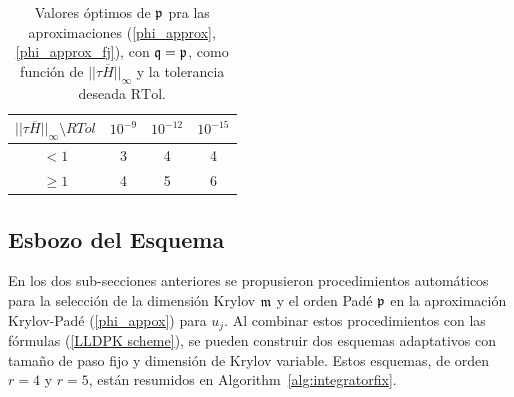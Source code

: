 \begin{table}[htb]
	\caption{Valores óptimos de $\mathfrak{p}$ pra las aproximaciones  (\ref{phi_approx},\ref{phi_approx_fj}), con $\mathfrak{q}=\mathfrak{p}$, como función de $\lvert\lvert \tau\overline{H} \rvert\rvert_\infty$ y la tolerancia deseada $\mathrm{RTol}$.}
	\begin{center}
		\begin{tabular}{cccc}
			\hline
			$\lvert\lvert \tau\overline{H} \rvert\rvert_\infty \setminus RTol$ & $10^{-9}$ & $10^{-12}$ & $10^{-15}$ \\
			\hline
			$<1$ & 3 & 4 & 4 \\
			$\geq 1$ & 4 & 5 & 6 \\
			\hline
		\end{tabular}
		\label{table:padep}
	\end{center}
\end{table}

\subsection{Esbozo del Esquema}

En los dos sub-secciones anteriores se propusieron procedimientos automáticos para la selección de la dimensión Krylov $\mathfrak{m}$ y el orden Padé $\mathfrak{p}$ en la aproximación Krylov-Padé (\ref{phi_appox}) para $u_j$. Al combinar estos procedimientos con las fórmulas (\ref{LLDPK scheme}), se pueden construir dos esquemas adaptativos con tamaño de paso fijo y dimensión de Krylov variable. Estos esquemas, de orden $r=4$ y $r=5$, están resumidos en Algorithm~\ref{alg:integratorfix}.

